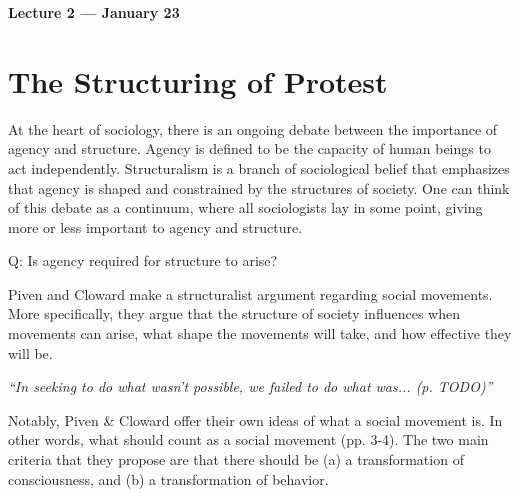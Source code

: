 
\noindent \textbf{Lecture 2 --- January 23\rd}

\section{The Structuring of Protest}
At the heart of sociology, there is an ongoing debate between the importance of agency and structure.
Agency is defined to be the capacity of human beings to act independently.
Structuralism is a branch of sociological belief that emphasizes that agency is shaped and constrained by the structures of society.
One can think of this debate as a continuum, where all sociologists lay in some point, giving more or less important to agency and structure.

\begin{center}
\end{center}

Q: Is agency required for structure to arise?

Piven and Cloward make a structuralist argument regarding social movements.
More specifically, they argue that the structure of society influences when movements can arise, what shape the movements will take, and how effective they will be.

\begin{center}
\textit{``In seeking to do what wasn't possible, we failed to do what was... (p. TODO)''}
\end{center}

Notably, Piven \& Cloward offer their own ideas of what a social movement is.
In other words, what should count as a social movement (pp. 3-4).
The two main criteria that they propose are that there should be (a) a transformation of consciousness, and (b) a transformation of behavior.

